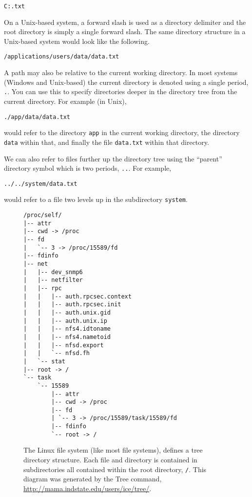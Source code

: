 \texttt{C:\applications\users\data\data.txt}

On a Unix-based system, a forward slash is used as
a directory delimiter and the root directory is simply a
single forward slash.  The same directory structure in
a Unix-based system would look like the following.

\texttt{/applications/users/data/data.txt}

A path may also be relative to the current working 
directory.  In most systems (Windows and Unix-based)
the current directory is denoted using a single period,
\texttt{.}.  You can use this to specify 
directories deeper in the directory tree from the current
directory.  For example (in Unix), 

\texttt{./app/data/data.txt}

would refer to the directory \texttt{app} in
the current working directory, the directory \texttt{data}
within that, and finally the file \texttt{data.txt}
within that directory.

We can also refer to files further up the directory 
tree using the ``parent'' directory symbol which is 
two periods, \texttt{..}.  For example, 

\texttt{../../system/data.txt}

would refer to a file two levels up in the subdirectory
\texttt{system}.

\begin{figure}
\centering
\begin{verbatim}
/proc/self/
|-- attr
|-- cwd -> /proc
|-- fd
|   `-- 3 -> /proc/15589/fd
|-- fdinfo
|-- net
|   |-- dev_snmp6
|   |-- netfilter
|   |-- rpc
|   |   |-- auth.rpcsec.context
|   |   |-- auth.rpcsec.init
|   |   |-- auth.unix.gid
|   |   |-- auth.unix.ip
|   |   |-- nfs4.idtoname
|   |   |-- nfs4.nametoid
|   |   |-- nfsd.export
|   |   `-- nfsd.fh
|   `-- stat
|-- root -> /
`-- task
    `-- 15589
        |-- attr
        |-- cwd -> /proc
        |-- fd
        | `-- 3 -> /proc/15589/task/15589/fd
        |-- fdinfo
        `-- root -> /
\end{verbatim}
\caption[Linux Tree Directory Structure]{The Linux file system (like most
file systems), defines a tree directory structure.  Each file and directory
is contained in subdirectories all contained within the root directory, 
\texttt{/}.  This diagram was generated by the Tree command, 
\url{http://mama.indstate.edu/users/ice/tree/}.}
\end{figure}

